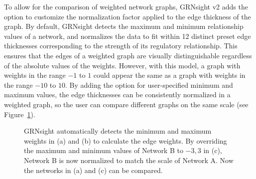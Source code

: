 \documentclass[sigconf,review]{acmart}
\begin{document}
To allow for the comparison of weighted network graphs, GRNsight v2 adds the option to customize the normalization factor applied to the edge thickness of the graph. By default, GRNsight detects the maximum and minimum relationship values of a network, and normalizes the data to fit within 12 distinct preset edge thicknesses corresponding to the strength of its regulatory relationship. This ensures that the edges of a weighted graph are visually distinguishable regardless of the absolute values of the weights. However, with this model, a graph with weights in the range \(-1\) to \(1\) could appear the same as a graph with weights in the range \(-10\) to \(10\). By adding the option for user-specified minimum and maximum values, the edge thicknesses can be consistently normalized in a weighted graph, so the user can compare different graphs on the same scale (see Figure~\ref{fig:network-screenshots}).

\begin{figure}[h]
    \centering
    \caption{GRNsight automatically detects the minimum and maximum weights in (a) and (b) to calculate the edge weights. By overriding the maximum and minimum values of Network B to \(-3, 3\) in (c), Network B is now normalized to match the scale of Network A. Now the networks in (a) and (c) can be compared.}
    \label{fig:network-screenshots}
\end{figure}
\end{document}
